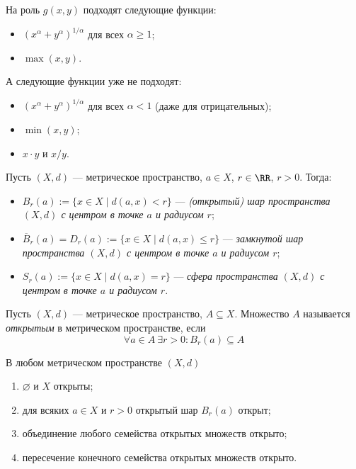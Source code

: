 \documentclass[12pt,a4paper]{article}
\begin{document}
    \begin{remark}
        На роль $g(x, y)$ подходят следующие функции:
        \begin{itemize}
            \item $(x^\alpha + y^\alpha)^{1/\alpha}$ для всех $\alpha \geqslant 1$;
            \item $\max(x, y)$.
        \end{itemize}
        А следующие функции уже не подходят:
        \begin{itemize}
            \item $(x^\alpha + y^\alpha)^{1/\alpha}$ для всех $\alpha < 1$ (даже для отрицательных);
            \item $\min(x, y)$;
            \item $x \cdot y$ и $x / y$.
        \end{itemize}
    \end{remark}

    \begin{definition}
        Пусть $(X, d)$ --- метрическое пространство, $a \in X$, $r \in \RR$, $r > 0$. Тогда:
        \begin{itemize}
            \item $B_r(a) := \{x \in X \mid d(a, x) < r\}$ --- \emph{(открытый) шар пространства $(X, d)$ с центром в точке $a$ и радиусом $r$};
            \item $\overline{B}_r(a) = D_r(a) := \{x \in X \mid d(a, x) \leqslant r\}$ --- \emph{замкнутой шар пространства $(X, d)$ с центром в точке $a$ и радиусом $r$};
            \item $S_r(a) := \{x \in X \mid d(a, x) = r\}$ --- \emph{сфера пространства $(X, d)$ с центром в точке $a$ и радиусом $r$}.
        \end{itemize}
    \end{definition}

    \begin{definition}
        Пусть $(X, d)$ --- метрическое пространство, $A \subseteq X$. Множество $A$ называется \emph{открытым} в метрическом пространстве, если
        \[\forall a \in A\ \exists r > 0: B_r(a) \subseteq A\]
    \end{definition}

    \begin{theorem}В любом метрическом пространстве $(X, d)$
        \begin{enumerate}
            \item $\varnothing$ и $X$ открыты;
            \item для всяких $a \in X$ и $r > 0$ открытый шар $B_r(a)$ открыт; 
            \item объединение любого семейства открытых множеств открыто;
            \item пересечение конечного семейства открытых множеств открыто.
        \end{enumerate}
    \end{theorem}
\end{document}

